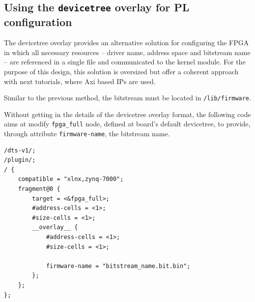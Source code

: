\documentclass[10pt,oneside]{article}
\begin{document}
\subsection{Using the {\tt devicetree} overlay for PL configuration}

The devicetree overlay provides an alternative solution for configuring the FPGA in which
all necessary resources -- driver name, address space and bitstream name -- are referenced
in a single file and communicated to the kernel module.
For the purpose of this design, this solution is oversized but offer a
coherent approach with next tutorials, where Axi based IPs are used.

Similar to the previous method, the bitstream must be located in {\tt /lib/firmware}.

Without getting in the details of the devicetree overlay format, the following code aims at
modify {\tt fpga\_full} node, defined at board's default devicetree, to provide,
through attribute {\tt firmware-name}, the bitstream name.
%
 
\begin{lstlisting}
/dts-v1/;
/plugin/;
/ {
    compatible = "xlnx,zynq-7000";
    fragment@0 {
        target = <&fpga_full>;
        #address-cells = <1>;
        #size-cells = <1>;
        __overlay__ {
            #address-cells = <1>;
            #size-cells = <1>;

            firmware-name = "bitstream_name.bit.bin";
        };
    };
};
\end{lstlisting}
\end{document}
